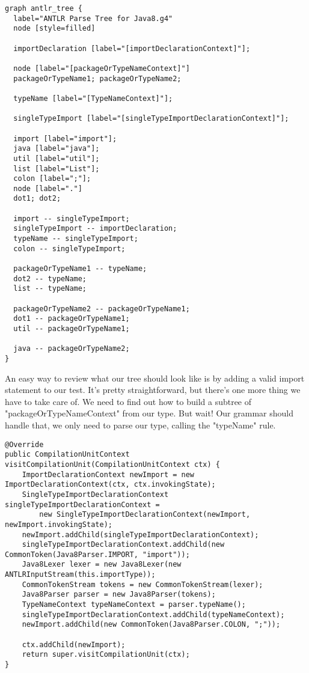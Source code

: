 \documentclass[11pt]{article}
\begin{document}
\begin{verbatim}
graph antlr_tree {
  label="ANTLR Parse Tree for Java8.g4"
  node [style=filled]

  importDeclaration [label="[importDeclarationContext]"];

  node [label="[packageOrTypeNameContext]"]
  packageOrTypeName1; packageOrTypeName2;

  typeName [label="[TypeNameContext]"];

  singleTypeImport [label="[singleTypeImportDeclarationContext]"];

  import [label="import"];
  java [label="java"];
  util [label="util"];
  list [label="List"];
  colon [label=";"];
  node [label="."]
  dot1; dot2;

  import -- singleTypeImport;
  singleTypeImport -- importDeclaration;
  typeName -- singleTypeImport;
  colon -- singleTypeImport;

  packageOrTypeName1 -- typeName;
  dot2 -- typeName;
  list -- typeName;

  packageOrTypeName2 -- packageOrTypeName1;
  dot1 -- packageOrTypeName1;
  util -- packageOrTypeName1;

  java -- packageOrTypeName2;
}
\end{verbatim}

An easy way to review what our tree should look like is by adding a valid import statement to our test. It's pretty straightforward,
but there's one more thing we have to take care of. We need to find out how to build a subtree of "packageOrTypeNameContext" from our type.
But wait! Our grammar should handle that, we only need to parse our type, calling the "typeName" rule.

\begin{verbatim}
@Override
public CompilationUnitContext visitCompilationUnit(CompilationUnitContext ctx) {
    ImportDeclarationContext newImport = new ImportDeclarationContext(ctx, ctx.invokingState);
    SingleTypeImportDeclarationContext singleTypeImportDeclarationContext =
        new SingleTypeImportDeclarationContext(newImport, newImport.invokingState);
    newImport.addChild(singleTypeImportDeclarationContext);
    singleTypeImportDeclarationContext.addChild(new CommonToken(Java8Parser.IMPORT, "import"));
    Java8Lexer lexer = new Java8Lexer(new ANTLRInputStream(this.importType));
    CommonTokenStream tokens = new CommonTokenStream(lexer);
    Java8Parser parser = new Java8Parser(tokens);
    TypeNameContext typeNameContext = parser.typeName();
    singleTypeImportDeclarationContext.addChild(typeNameContext);
    newImport.addChild(new CommonToken(Java8Parser.COLON, ";"));

    ctx.addChild(newImport);
    return super.visitCompilationUnit(ctx);
}
\end{verbatim}
\end{document}
